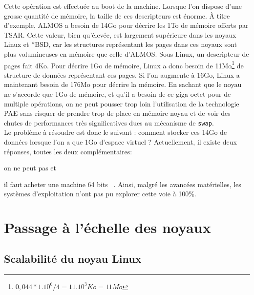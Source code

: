       Cette opération est effectuée au boot de la machine. Lorsque l’on dispose
      d’une grosse quantité de mémoire, la taille de ces descripteurs est
      énorme. À titre d’exemple, ALMOS a besoin de 14Go pour décrire les 1To de
      mémoire offerts par TSAR. Cette valeur, bien qu’élevée, est largement
      supérieure dans les noyaux Linux et *BSD, car les structures représentant
      les pages dans ces noyaux sont plus volumineuses en mémoire que celle
      d’ALMOS. Sous Linux, un descripteur de pages fait 4Ko. Pour décrire 1Go de
      mémoire, Linux a donc besoin de 11Mo\footnote{$0,044*1.10^6/4 = 11.10^3Ko
        = 11Mo$} de structure de données représentant ces pages. Si l'on
      augmente à 16Go, Linux a maintenant besoin de 176Mo pour décrire la
      mémoire. En sachant que le noyau ne s'accorde que 1Go de mémoire, et qu'il
      a besoin de ce giga-octet pour de multiple opérations, on ne peut pousser
      trop loin l'utilisation de la technologie PAE sans risquer de prendre trop
      de place en mémoire noyau et de voir des chutes de performances très
      significatives dues au mécanisme de \texttt{swap}.\\

      Le problème à résoudre est donc le suivant : comment stocker ces 14Go de
      données lorsque l’on a que 1Go d’espace virtuel ?  Actuellement, il existe
      deux réponses, toutes les deux complémentaires: \benumline \item on ne
      peut pas et \item il faut acheter une machine 64
      bits~\citep{gorman2004understanding} \eenumline. Ainsi, malgré les
      avancées matérielles, les systèmes d'exploitation n'ont pas pu explorer
      cette voie à 100\%.

  
  \section{Passage à l’échelle des noyaux}
  \label{sec:scalability}

    \subsection{Scalabilité du noyau Linux}


